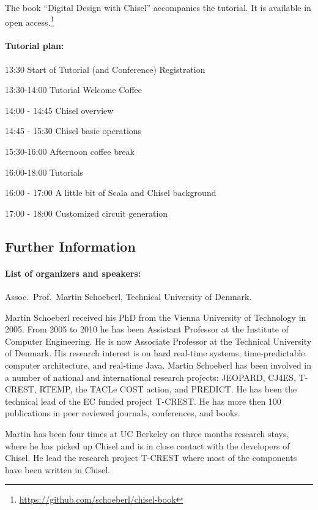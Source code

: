 \documentclass{article}
\begin{document}
The book ``Digital Design with Chisel'' accompanies the tutorial.
It is available in open access.\footnote{\url{https://github.com/schoeberl/chisel-book}}


\paragraph{Tutorial plan:}

13:30 Start of Tutorial (and Conference) Registration

13:30-14:00 Tutorial Welcome Coffee

14:00 - 14:45 Chisel overview

14:45 - 15:30 Chisel basic operations

15:30-16:00 Afternoon coffee break

16:00-18:00 Tutorials

16:00 - 17:00 A little bit of Scala and Chisel background 

17:00 - 18:00 Customized circuit generation


\subsection*{Further Information}

\paragraph{List of organizers and speakers:}
Assoc.~Prof.~Martin Schoeberl, Technical University of Denmark.

Martin Schoeberl received his PhD from the Vienna University of Technology in 2005. From 2005 to 2010 he has been Assistant Professor at the Institute of Computer Engineering. He is now Associate Professor at the Technical University of Denmark. His research interest is on hard real-time systems, time-predictable computer architecture, and real-time Java.  Martin Schoeberl has been involved in a number of national and international research projects: JEOPARD, CJ4ES, T-CREST, RTEMP, the TACLe COST action, and PREDICT.  He has been the technical lead of the EC funded project T-CREST.  He has more then 100 publications in peer reviewed journals, conferences, and books.

Martin has been four times at UC Berkeley on three months research stays, where he has picked up Chisel
and is in close contact with the developers of Chisel.
He lead the research project T-CREST where most of the components have been written in Chisel.
\end{document}
